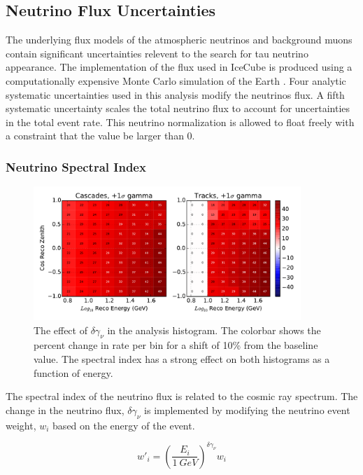 \label{subsec:nuflux_systematics}
\subsection{Neutrino Flux Uncertainties}
The underlying flux models of the atmospheric neutrinos and background muons contain significant uncertainties relevent to the search for tau neutrino appearance. 
The implementation of the flux used in IceCube is produced using a computationally expensive Monte Carlo simulation of the Earth \cite{Honda-2015}.
Four analytic systematic uncertainties used in this analysis modify the neutrinos flux.
A fifth systematic uncertainty scales the total neutrino flux to account for uncertainties in the total event rate.
This neutrino normalization is allowed to float freely with a constraint that the value be larger than 0.

\label{subsubsec:gamma_nu}
\subsubsection{Neutrino Spectral Index}
\begin{figure}
\centering
\includegraphics[width=0.9\textwidth]{systematics/gamma_variation.pdf} 
\caption[Effect of $\delta \gamma_\nu$ in the analysis histogram]{The effect of $\delta \gamma_\nu$ in the analysis histogram. The colorbar shows the percent change in rate per bin for a shift of 10\% from the baseline value. The spectral index has a strong effect on both histograms as a function of energy.}
\label{fig:systematics_gamma}
\end{figure}

The spectral index of the neutrino flux is related to the cosmic ray spectrum. 
The change in the neutrino flux, $\delta \gamma_\nu$ is implemented by modifying the neutrino event weight, $w_i$ based on the energy of the event.

\begin{equation}
w'_i = \left(\frac{E_{i}}{1~GeV}\right)^{\delta \gamma_\nu} w_i
\end{equation}

